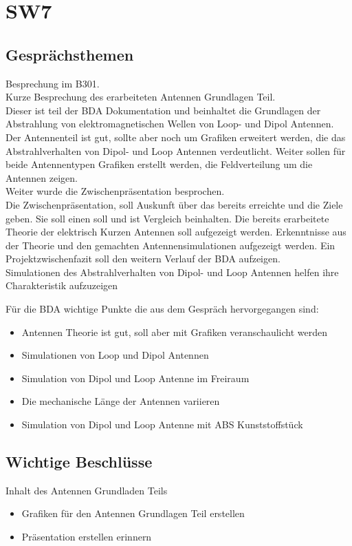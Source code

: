 \documentclass[10pt,a4paper]{article}
\begin{document}
\section*{SW7}

\subsection*{Gesprächsthemen}

Besprechung im B301.\\
Kurze Besprechung des erarbeiteten Antennen Grundlagen Teil.\\
Dieser ist teil der BDA Dokumentation und beinhaltet die Grundlagen der Abstrahlung von elektromagnetischen Wellen von Loop- und Dipol Antennen. Der Antennenteil ist gut, sollte aber noch um Grafiken erweitert werden, die das Abstrahlverhalten von Dipol- und Loop Antennen verdeutlicht. Weiter sollen für beide Antennentypen Grafiken erstellt werden, die Feldverteilung um die Antennen zeigen.\\
Weiter wurde die  Zwischenpräsentation besprochen.\\
Die Zwischenpräsentation, soll Auskunft über das bereits erreichte und die Ziele geben. Sie soll einen \glqq soll und ist \grqq Vergleich beinhalten. Die bereits erarbeitete Theorie der elektrisch Kurzen Antennen soll aufgezeigt werden. Erkenntnisse aus der Theorie und den gemachten Antennensimulationen  aufgezeigt werden. Ein Projektzwischenfazit soll den weitern Verlauf der BDA aufzeigen.\\
Simulationen des Abstrahlverhalten von Dipol- und Loop Antennen helfen ihre Charakteristik aufzuzeigen


\vspace{10 mm}
Für die BDA wichtige Punkte die aus dem Gespräch hervorgegangen sind:
\begin{itemize}
	\item Antennen Theorie ist gut, soll aber mit Grafiken veranschaulicht werden
	\item Simulationen von Loop und Dipol Antennen
	\item Simulation von Dipol und Loop Antenne im Freiraum
	\item Die mechanische Länge der Antennen variieren
	\item Simulation von Dipol und Loop Antenne  mit ABS Kunststoffstück

\end{itemize}

\subsection*{Wichtige Beschlüsse}
Inhalt des Antennen Grundladen Teils
\begin{itemize}
	\item Grafiken für den Antennen Grundlagen Teil erstellen
	\item Präsentation erstellen
 erinnern
\end{itemize}
\end{document}
